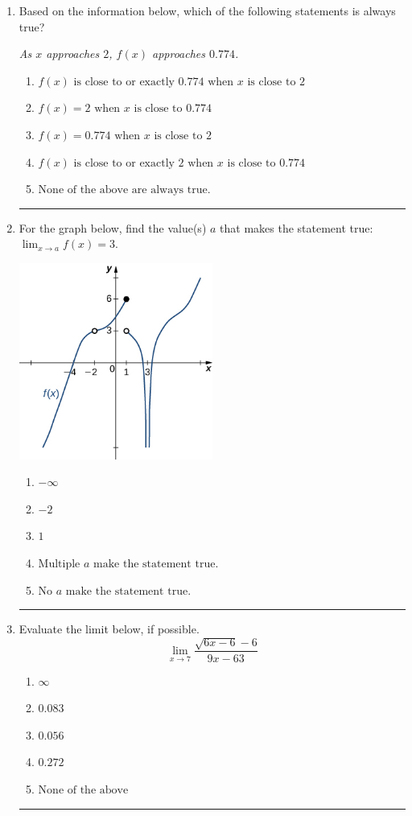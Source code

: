 \documentclass[14pt]{extbook}
\newcommand{\litem}[1]{\item#1\hspace*{-1cm}\rule{\textwidth}{0.4pt}}
\begin{document}
\begin{enumerate}
{\begin{enumerate}[label=\Alph*.]
\end{enumerate} }
\litem{
Based on the information below, which of the following statements is always true?
\begin{center}
    \textit{ As $x$ approaches $2$, $f(x)$ approaches $0.774$. }
\end{center}
\begin{enumerate}[label=\Alph*.]
\item \( f(x) \text{ is close to or exactly } 0.774 \text{ when } x \text{ is close to } 2 \)
\item \( f(x) = 2 \text{ when } x \text{ is close to } 0.774 \)
\item \( f(x) = 0.774 \text{ when } x \text{ is close to } 2 \)
\item \( f(x) \text{ is close to or exactly } 2 \text{ when } x \text{ is close to } 0.774 \)
\item \( \text{None of the above are always true.} \)

\end{enumerate} }
\litem{
For the graph below, find the value(s) $a$ that makes the statement true: $ \displaystyle \lim_{x \rightarrow a} f(x) = 3$.
\begin{center}
    \includegraphics[width=0.5\textwidth]{../Figures/evaluateLimitGraphicallyA.png}
\end{center}
\begin{enumerate}[label=\Alph*.]
\item \( -\infty \)
\item \( -2 \)
\item \( 1 \)
\item \( \text{Multiple } a \text{ make the statement true}. \)
\item \( \text{No } a \text{ make the statement true}. \)

\end{enumerate} }
\litem{
Evaluate the limit below, if possible.\[ \lim_{x \rightarrow 7} \frac{\sqrt{6x - 6} - 6}{9x - 63} \]\begin{enumerate}[label=\Alph*.]
\item \( \infty \)
\item \( 0.083 \)
\item \( 0.056 \)
\item \( 0.272 \)
\item \( \text{None of the above} \)


\end{enumerate}}
\end{enumerate}
\end{document}
